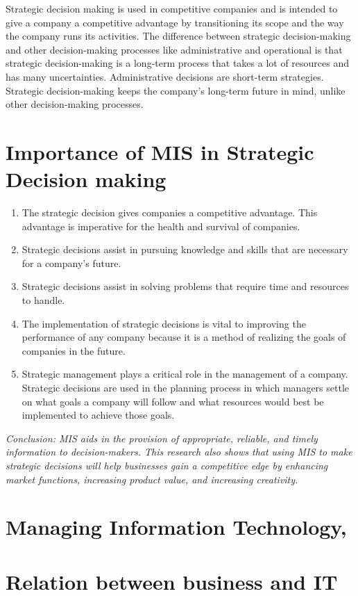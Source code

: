 \documentclass[a4paper]{article}
\begin{document}
Strategic decision making is used in competitive companies and is intended to give a company a competitive advantage by transitioning its scope and the way the company runs its activities. The difference between strategic decision-making and other decision-making processes like administrative and operational is that strategic decision-making is a long-term process that takes a lot of resources and has many uncertainties. Administrative decisions are short-term strategies. Strategic decision-making keeps the company's long-term future in mind, unlike other decision-making processes.

\section{Importance of MIS in Strategic Decision making}
\begin{enumerate}
  \item The strategic decision gives companies a competitive advantage. This advantage is imperative for the health and survival of companies.
  \item Strategic decisions assist in pursuing knowledge and skills that are necessary for a company's future.
  \item Strategic decisions assist in solving problems that require time and resources to handle.
  \item The implementation of strategic decisions is vital to improving the performance of any company because it is a method of realizing the goals of companies in the future.
  \item Strategic management plays a critical role in the management of a company. Strategic decisions are used in the planning process in which managers settle on what goals a company will follow and what resources would best be implemented to achieve those goals.
\end{enumerate}

\noindent\emph{Conclusion: MIS aids in the provision of appropriate, reliable, and timely information to decision-makers. This research also shows that using MIS to make strategic decisions will help businesses gain a competitive edge by enhancing market functions, increasing product value, and increasing creativity.}

\pagebreak
\section{Managing Information Technology,}
\section{Relation between business and IT }
\end{document}

